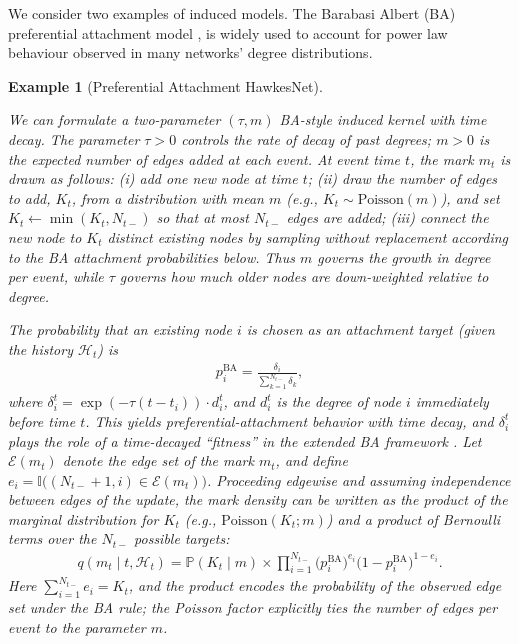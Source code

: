 \documentclass[12pt]{article}
\newtheorem{example}{Example}
\begin{document}
We consider two examples of induced models. The Barabasi Albert (BA) preferential attachment model \citep{BA_model}, is widely used to account for power law behaviour observed in many networks' degree distributions.

\begin{example}[Preferential Attachment HawkesNet]\label{ex:BA}

We can formulate a two-parameter $(\tau, m)$ BA-style induced kernel with time decay. The parameter $\tau > 0$ controls the rate of decay of past degrees; $m > 0$ is the expected number of edges added at each event. At event time $t$, the mark $m_t$ is drawn as follows: (i) add one new node at time $t$; (ii) draw the number of edges to add, $K_t$, from a distribution with mean $m$ (e.g., $K_t \sim \text{Poisson}(m)$), and set $K_t \leftarrow \min(K_t, N_{t-})$ so that at most $N_{t-}$ edges are added; (iii) connect the new node to $K_t$ distinct existing nodes by sampling without replacement according to the BA attachment probabilities below. Thus $m$ governs the growth in degree per event, while $\tau$ governs how much older nodes are down-weighted relative to degree.

The probability that an existing node $i$ is chosen as an attachment target (given the history $\mathcal{H}_t$) is
\begin{align*}
p_i^{\text{BA}} = \frac{\delta_i}{\sum_{k=1}^{N_{t-}} \delta_k},
\end{align*}
where $\delta_i^t = \exp(-\tau (t - t_i)) \cdot d_i^t$, and $d_i^t$ is the degree of node $i$ immediately before time $t$. This yields preferential-attachment behavior with time decay, and $\delta_i^t$ plays the role of a time-decayed ``fitness'' in the extended BA framework \citep{BA_fitness_2001}. Let $\mathcal{E}(m_t)$ denote the edge set of the mark $m_t$, and define $e_i = \mathbb{I}\bigl((N_{t-}+1, i) \in \mathcal{E}(m_t)\bigr)$. Proceeding edgewise and assuming independence between edges of the update, the mark density can be written as the product of the marginal distribution for $K_t$ (e.g., $\text{Poisson}(K_t; m)$) and a product of Bernoulli terms over the $N_{t-}$ possible targets:
\begin{align}\label{eq:bernoulli}
q(m_t \mid t, \mathcal{H}_t) = \mathbb{P}(K_t \mid m) \times \prod_{i=1}^{N_{t-}} \bigl(p_i^{\text{BA}}\bigr)^{e_i} \bigl(1 - p_i^{\text{BA}}\bigr)^{1-e_i}.
\end{align}
Here $\sum_{i=1}^{N_{t-}} e_i = K_t$, and the product encodes the probability of the observed edge set under the BA rule; the Poisson factor explicitly ties the number of edges per event to the parameter $m$.
\end{example}
\end{document}
